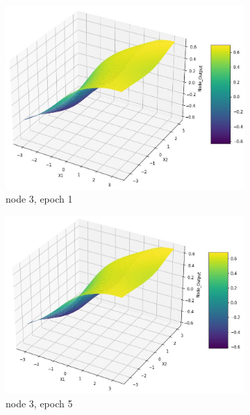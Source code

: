 \documentclass[11pt]{article}
\begin{document}
\begin{figure}[h!]
\begin{subfigure}[b]{0.3\textwidth}
	\includegraphics[scale=0.14]{hidden2_n3_e1.jpg}
	\caption{node 3, epoch 1}
	\label{fig:fig2.1.6.11}
	\end{subfigure}
	\begin{subfigure}[b]{0.3\textwidth}
	\centering
	\includegraphics[scale=0.14]{hidden2_n3_e5.jpg}
	\caption{node 3, epoch 5}
	\label{fig:fig2.1.6.12}
	\end{subfigure}
	\begin{subfigure}[b]{0.3\textwidth}
	\centering

\end{subfigure}
\end{figure}
\end{document}
